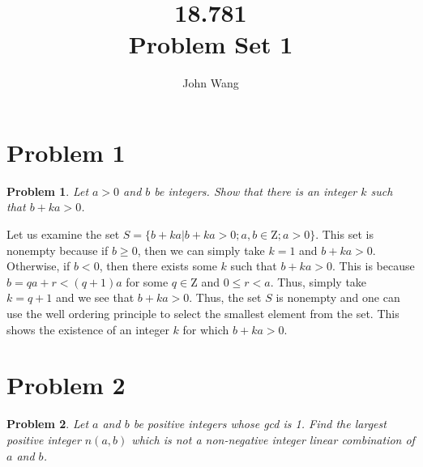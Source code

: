 \documentclass[psamsfonts]{amsart}
\title{18.781 \\
Problem Set 1}
\author{John Wang}
\newtheorem{prob}{Problem}[section]
\newenvironment{sol}{{\bfseries Solution}}{\qedsymbol}
\theoremstyle{definition}
\theoremstyle{remark}
\numberwithin{equation}{section}
\begin{document}
\maketitle

\section{Problem 1}

\begin{prob}
Let $a >0$ and $b$ be integers. Show that there is an integer $k$ such that $b + ka > 0$. 
\end{prob}

\begin{sol}
Let us examine the set $S = \{ b + ka | b +ka >0; a, b \in \mathrm{Z}; a > 0\}$. This set is nonempty because if $b \geq 0$, then we can simply take $k=1$ and $b + ka > 0$. Otherwise, if $b < 0$, then there exists some $k$ such that $b + ka > 0$. This is because $b = qa + r < (q+1)a$ for some $q \in \mathrm{Z}$ and $0 \leq r < a$. Thus, simply take $k = q + 1$ and we see that $b + ka > 0$. Thus, the set $S$ is nonempty and one can use the well ordering principle to select the smallest element from the set. This shows the existence of an integer $k$ for which $b + ka > 0$. 
\end{sol}

\section{Problem 2}

\begin{prob}
Let $a$ and $b$ be positive integers whose gcd is 1. Find the largest positive integer $n(a,b)$ which is not a non-negative integer linear combination of $a$ and $b$.
\end{prob}
\end{document}
